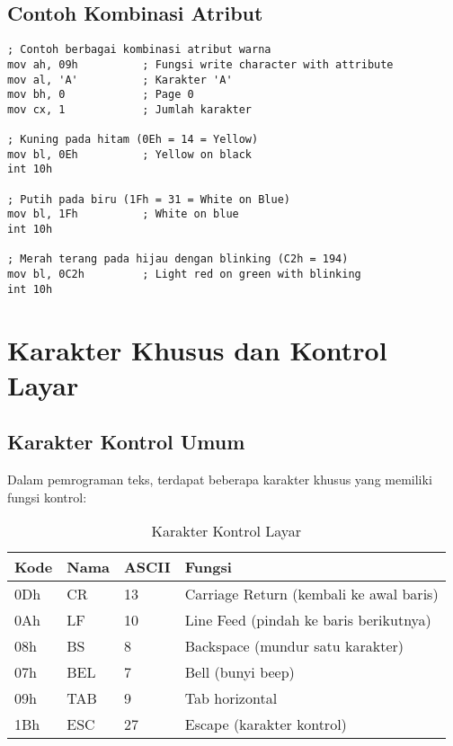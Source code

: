 \documentclass[../main.tex]{subfiles}
\begin{document}
            \subsection{Contoh Kombinasi Atribut}
                \begin{lstlisting}[language={[x86masm]Assembler}, caption=Contoh Penggunaan Atribut Warna, label={lst:color-attributes}]
; Contoh berbagai kombinasi atribut warna
mov ah, 09h          ; Fungsi write character with attribute
mov al, 'A'          ; Karakter 'A'
mov bh, 0            ; Page 0
mov cx, 1            ; Jumlah karakter

; Kuning pada hitam (0Eh = 14 = Yellow)
mov bl, 0Eh          ; Yellow on black
int 10h

; Putih pada biru (1Fh = 31 = White on Blue)
mov bl, 1Fh          ; White on blue
int 10h

; Merah terang pada hijau dengan blinking (C2h = 194)
mov bl, 0C2h         ; Light red on green with blinking
int 10h
                \end{lstlisting}

    \section{Karakter Khusus dan Kontrol Layar}
        \subsection{Karakter Kontrol Umum}
            Dalam pemrograman teks, terdapat beberapa karakter khusus yang memiliki fungsi kontrol:
            
            \begin{table}[H]
                \centering
                \caption{Karakter Kontrol Layar}
                \begin{tabular}{|p{1.5cm}|p{2cm}|p{2cm}|p{5cm}|}
                \hline
                \textbf{Kode} & \textbf{Nama} & \textbf{ASCII} & \textbf{Fungsi} \\
                \hline
                0Dh & CR & 13 & Carriage Return (kembali ke awal baris) \\
                \hline
                0Ah & LF & 10 & Line Feed (pindah ke baris berikutnya) \\
                \hline
                08h & BS & 8 & Backspace (mundur satu karakter) \\
                \hline
                07h & BEL & 7 & Bell (bunyi beep) \\
                \hline
                09h & TAB & 9 & Tab horizontal \\
                \hline
                1Bh & ESC & 27 & Escape (karakter kontrol) \\
                \hline
                \end{tabular}
            \end{table}
\end{document}

